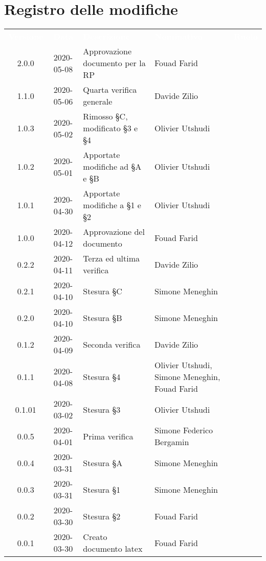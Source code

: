 \section*{Registro delle modifiche}
{
	\centering
	\begin{longtable}{ c c  C{4cm}  C{3.5cm}  C{3.5cm} }
		\textcolor{white}{\textbf{Versione}} & \textcolor{white}{\textbf{Data}} & \textcolor{white}{\textbf{Descrizione}} & \textcolor{white}{\textbf{Nominativo}} & \textcolor{white}{\textbf{Ruolo}}\\	
		2.0.0 & 2020-05-08 & Approvazione documento per la RP & Fouad Farid &\RdP \\
		1.1.0 & 2020-05-06 & Quarta verifica generale & Davide Zilio & \ver{}\\
		1.0.3 & 2020-05-02 & Rimosso §C, modificato \S 3 e \S 4 & Olivier Utshudi &\prog \\		
		1.0.2 & 2020-05-01 & Apportate modifiche ad §A e §B & Olivier Utshudi &\prog \\
		1.0.1 & 2020-04-30 & Apportate modifiche a §1 e §2 & Olivier Utshudi &\prog \\
		1.0.0 & 2020-04-12 & Approvazione del documento & Fouad Farid &\RdP{} \\
		0.2.2 & 2020-04-11 & Terza ed ultima verifica & Davide Zilio &\ver{} \\
		0.2.1 & 2020-04-10 & Stesura \S C & Simone Meneghin &\prog{} \\
		0.2.0 & 2020-04-10 & Stesura \S B & Simone Meneghin &\prog{} \\
		0.1.2 & 2020-04-09 & Seconda verifica & Davide Zilio &\ver{} \\
		0.1.1 & 2020-04-08 & Stesura \S 4 & Olivier Utshudi, Simone Meneghin, Fouad Farid &\prog{} \\
		0.1.01 & 2020-03-02 & Stesura \S 3 & Olivier Utshudi &\prog{} \\
		0.0.5 & 2020-04-01 & Prima verifica & Simone Federico Bergamin &\ver{} \\
		0.0.4 & 2020-03-31 & Stesura \S A & Simone Meneghin &\prog{} \\
		0.0.3 & 2020-03-31 & Stesura \S 1 & Simone Meneghin &\prog{} \\
		0.0.2 & 2020-03-30 & Stesura \S 2 & Fouad Farid &\prog{} \\
		0.0.1 & 2020-03-30 & Creato documento latex & Fouad Farid &\prog{}\\		
		
	\end{longtable}

}